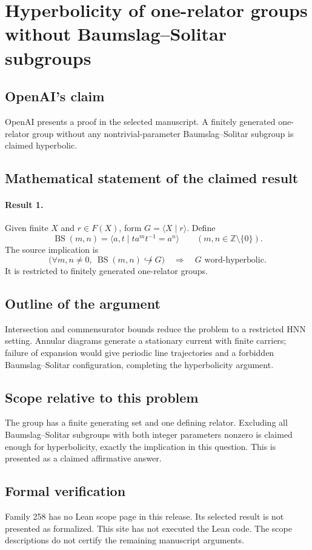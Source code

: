 \documentclass[11pt]{article}
\begin{document}
\section*{Hyperbolicity of one-relator groups without Baumslag–Solitar subgroups}

\subsection{OpenAI's claim}
OpenAI presents a proof in the selected manuscript. A finitely generated one-relator group without any nontrivial-parameter Baumslag--Solitar subgroup is claimed hyperbolic.

\subsection{Mathematical statement of the claimed result}
\paragraph{Result 1.} Given finite \(X\) and \(r\in F(X)\), form \(G=\langle X\mid r\rangle\). Define
\[
 \operatorname{BS}(m,n)=\langle a,t\mid ta^mt^{-1}=a^n\rangle
 \qquad(m,n\in\mathbb Z\setminus\{0\}).
\]
The source implication is
\[
 \bigl(\forall m,n\ne0,\ \operatorname{BS}(m,n)\not\hookrightarrow G\bigr)
 \quad\Longrightarrow\quad G\text{ word-hyperbolic}.
\]
It is restricted to finitely generated one-relator groups.

\subsection{Outline of the argument}
Intersection and commensurator bounds reduce the problem to a restricted HNN setting. Annular diagrams generate a stationary current with finite carriers; failure of expansion would give periodic line trajectories and a forbidden Baumslag--Solitar configuration, completing the hyperbolicity argument.

\subsection{Scope relative to this problem}
The group has a finite generating set and one defining relator. Excluding all Baumslag--Solitar subgroups with both integer parameters nonzero is claimed enough for hyperbolicity, exactly the implication in this question. This is presented as a claimed affirmative answer.

\subsection{Formal verification}
Family 258 has no Lean scope page in this release. Its selected result is not presented as formalized. This site has not executed the Lean code. The scope descriptions do not certify the remaining manuscript arguments.
\end{document}

